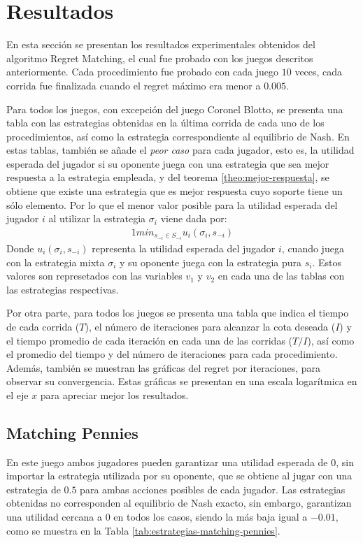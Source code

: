 \section{Resultados}
En esta sección se presentan los resultados experimentales obtenidos del algoritmo Regret Matching, el cual fue probado con los juegos descritos anteriormente. Cada procedimiento fue probado con cada juego $10$ veces, cada corrida fue finalizada cuando el regret máximo era menor a $0.005$.

Para todos los juegos, con excepción del juego Coronel Blotto, se presenta una tabla con las estrategias obtenidas en la última corrida de cada uno de los procedimientos, así como la estrategia correspondiente al equilibrio de Nash. En estas tablas, también se añade el \textit{peor caso} para cada jugador, esto es, la utilidad esperada del jugador si su oponente juega con una estrategia que sea mejor respuesta a la estrategia empleada, y del teorema \ref{theo:mejor-respuesta}, se obtiene que existe una estrategia que es mejor respuesta cuyo soporte tiene un sólo elemento. Por lo que el menor valor posible para la utilidad esperada del jugador $i$ al utilizar la estrategia $\sigma_i$ viene dada por:
\begin{alignat}{1}
min_{s_{-i} \in S_{-i}} u_i(\sigma_i, s_{-i})
\end{alignat}
Donde $u_i(\sigma_i, s_{-i})$ representa la utilidad esperada del jugador $i$, cuando juega con la estrategia mixta $\sigma_i$ y su oponente juega con la estrategia pura $s_i$. Estos valores son represetados con las variables $v_1$ y $v_2$ en cada una de las tablas con las estrategias respectivas.

Por otra parte, para todos los juegos se presenta una tabla que indica el tiempo de cada corrida ($T$), el número de iteraciones para alcanzar la cota deseada ($I$) y el tiempo promedio de cada iteración en cada una de las corridas ($T/I$), así como el promedio del tiempo y del número de iteraciones para cada procedimiento. Además, también se muestran las gráficas del regret por iteraciones, para observar su convergencia. Estas gráficas se presentan en una escala logarítmica en el eje $x$ para apreciar mejor los resultados.

\subsection{Matching Pennies}
En este juego ambos jugadores pueden garantizar una utilidad esperada de $0$, sin importar la estrategia utilizada por su oponente, que se obtiene al jugar con una estrategia de $0.5$ para ambas acciones posibles de cada jugador. Las estrategias obtenidas no corresponden al equilibrio de Nash exacto, sin embargo, garantizan una utilidad cercana a $0$ en todos los casos, siendo la más baja igual a $-0.01$, como se muestra en la Tabla \ref{tab:estrategias-matching-pennies}.

